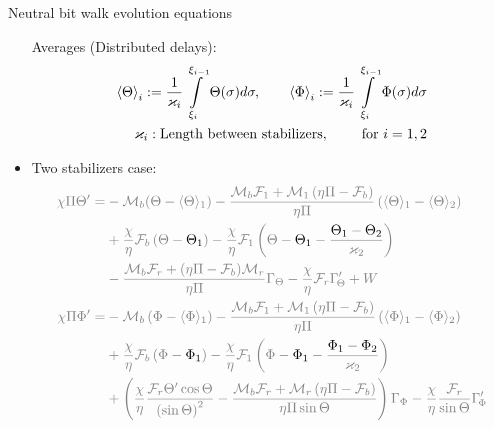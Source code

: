 \documentclass{beamer}
\begin{document}
\begin{frame}{Neutral bit walk evolution equations}
\begin{itemize}
		 Averages (Distributed delays):
		\begin{align*}
			{{\rm{\langle\Theta\rangle }}_i}:= \frac{1}{\varkappa_i}\int \limits_{\xi_{i}}^{\xi_{i-1}} \Theta(\sigma)d\sigma, \qquad
			{{\rm{\langle\Phi\rangle }}_i}:=\frac{1}{\varkappa_i}\int \limits_{\xi_{i}}^{\xi_{i-1}} \Phi(\sigma)d\sigma
			\label{eq:definitionaveragestates} \\
			\varkappa_i: \text{Length between stabilizers}, \qquad \text{ for } i = 1,2
		\end{align*}
		\item <4|only@4> [] Two stabilizers case: \footnotesize
		\begin{equation}
		\begin{aligned}
		\color{gray}\chi \Pi \Theta ' =  &\color{gray}- \mathcal{M}_b(\Theta-\langle\Theta \rangle_1)-\frac{{{\mathcal{M}_b}{\mathcal{F}_1} + {\mathcal{M}_1}\left( {\eta \Pi  - {\mathcal{F}_b}} \right)}}{{\eta \Pi }}\left( {{\langle{\Theta} \rangle_1} - {\langle{\Theta} \rangle_{2}}} \right)
		\\
		&\color{gray}+\frac{\chi }{\eta }{\mathcal{F}_b}\left( {{\Theta} - {\color{black}{\Theta}_1 \color{gray}}} \right)
		- \frac{\chi }{\eta }{\mathcal{F}_1}\left( {{{{{\Theta}} - {\color{black}{\Theta}_1\color{gray}}}} - \frac{{{\color{black}{\Theta}_1\color{gray}} - \color{black}{{\Theta}_{2}\color{gray}}}}{{{\varkappa _{2}}}}} \right)
		\\
		&\color{gray}- \frac{{{\mathcal{M}_b}{\mathcal{F}_r} + (\eta \Pi  - {\mathcal{F}_b}){\mathcal{M}_r}}}{{\eta \Pi }}{\Gamma _{\Theta}} - \frac{\chi }{\eta }{\mathcal{F}_r}\Gamma_{\!\Theta}' + W
		\\
		\color{gray}\chi \Pi \Phi ' =  &\color{gray}- {\mathcal{M}_b}\left( {\Phi  - {\langle{\Phi} \rangle_1}} \right)-\frac{{{\mathcal{M}_b}{\mathcal{F}_1} + {\mathcal{M}_1}\left( {\eta \Pi  - {\mathcal{F}_b}} \right)}}{{\eta \Pi }}\left( {{\langle{\Phi} \rangle_1} - {\langle{\Phi} \rangle_{2}}} \right)
		\\
		&\color{gray}+\frac{\chi }{\eta }{\mathcal{F}_b}\left( {{\Phi} - {\color{black}{\Phi}_1\color{gray}}} \right)
		- \frac{\chi }{\eta }{\mathcal{F}_1}\left( {{{{{\Phi}} - {\color{black}{\Phi}_1\color{gray}}}} - \frac{{{\color{black}{\Phi}_1\color{black}} - {\color{black}{\Phi}_{2}\color{gray}}}}{{{\varkappa _{2}}}}} \right)
		\\
		&\color{gray}+ \left( {\frac{\chi }{\eta }\frac{{{\mathcal{F}_r}\Theta '\cos \Theta }}{{{{\left( {\sin \Theta } \right)}^2}}} - \frac{{{\mathcal{M}_b}{\mathcal{F}_r} + {\mathcal{M}_r}\left( {\eta \Pi  - {\mathcal{F}_b}} \right)}}{{\eta \Pi \sin \Theta }}} \right){\Gamma _{\Phi}} - \frac{\chi }{\eta }\frac{{{\mathcal{F}_r}}}{{\sin \Theta }}\Gamma_{\!\Phi}'

\end{aligned}
\end{equation}
\end{itemize}
\end{frame}
\end{document}
